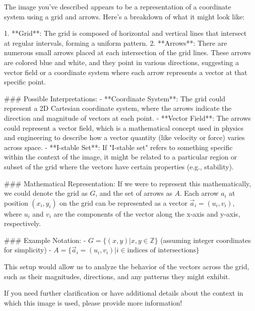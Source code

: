 The image you've described appears to be a representation of a coordinate system using a grid and arrows. Here's a breakdown of what it might look like:

1. **Grid**: The grid is composed of horizontal and vertical lines that intersect at regular intervals, forming a uniform pattern.
2. **Arrows**: There are numerous small arrows placed at each intersection of the grid lines. These arrows are colored blue and white, and they point in various directions, suggesting a vector field or a coordinate system where each arrow represents a vector at that specific point.

### Possible Interpretations:
- **Coordinate System**: The grid could represent a 2D Cartesian coordinate system, where the arrows indicate the direction and magnitude of vectors at each point.
- **Vector Field**: The arrows could represent a vector field, which is a mathematical concept used in physics and engineering to describe how a vector quantity (like velocity or force) varies across space.
- **I-stable Set**: If "I-stable set" refers to something specific within the context of the image, it might be related to a particular region or subset of the grid where the vectors have certain properties (e.g., stability).

### Mathematical Representation:
If we were to represent this mathematically, we could denote the grid as \( G \), and the set of arrows as \( A \). Each arrow \( a_i \) at position \( (x_i, y_i) \) on the grid can be represented as a vector \( \vec{a}_i = (u_i, v_i) \), where \( u_i \) and \( v_i \) are the components of the vector along the x-axis and y-axis, respectively.

### Example Notation:
- \( G = \{(x, y) | x, y \in \mathbb{Z}\} \) (assuming integer coordinates for simplicity)
- \( A = \{ \vec{a}_i = (u_i, v_i) | i \in \text{indices of intersections} \} \)

This setup would allow us to analyze the behavior of the vectors across the grid, such as their magnitudes, directions, and any patterns they might exhibit.

If you need further clarification or have additional details about the context in which this image is used, please provide more information!